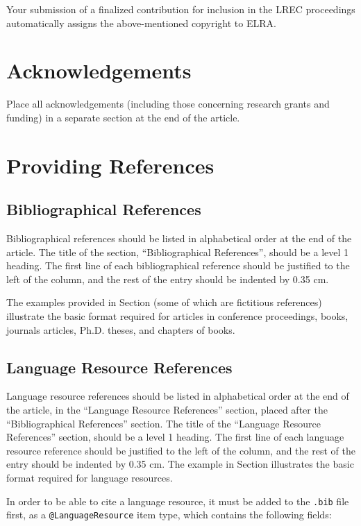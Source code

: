 \documentclass[10pt, a4paper]{article}
\newcommand{\secref}[1]{\StrSubstitute{\getrefnumber{#1}}{.}{ }}
\begin{document}
Your submission of a finalized contribution for inclusion in the LREC
proceedings automatically assigns the above-mentioned copyright to ELRA.


\section{Acknowledgements}

Place all acknowledgements (including those concerning research grants and
funding) in a separate section at the end of the article.

\section{Providing References}

\subsection{Bibliographical References}
Bibliographical references should be listed in alphabetical order at the
end of the article. The title of the section, ``Bibliographical References'',
should be a level 1 heading. The first line of each bibliographical reference
should be justified to the left of the column, and the rest of the entry should
be indented by 0.35 cm.

The examples provided in Section \secref{main:ref} (some of which are fictitious
references) illustrate the basic format required for articles in conference
proceedings, books, journals articles, Ph.D. theses, and chapters of books.

\subsection{Language Resource References}

Language resource references should be listed in alphabetical order at the end
of the article, in the ``Language Resource References'' section, placed after
the ``Bibliographical References'' section. The title of the ``Language Resource
References'' section, should be a level 1 heading. The first line of each
language resource reference should be justified to the left of the column, and
the rest of the entry should be indented by 0.35 cm. The example in Section 
\secref{lr:ref} illustrates the basic format required for language resources.

In order to be able to cite a language resource, it must be added to
the \texttt{.bib} file first, as a \texttt{@LanguageResource} item type, which
contains the following fields:
\end{document}
